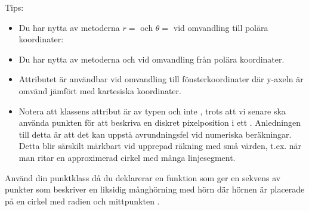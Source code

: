 \noindent Tips:
\begin{itemize}
\item Du har nytta av metoderna $r = $  och $\theta = $  vid omvandling till polära koordinater:


\item Du har nytta av metoderna  och  vid omvandling från polära koordinater.

\item Attributet  är användbar vid omvandling till fönsterkoordinater där y-axeln är omvänd jämfört med kartesiska koordinater.

\item Notera att klassens attribut är av typen  och inte , trots att vi senare ska använda punkten för att beskriva en diskret pixelposition i ett . Anledningen till detta är att det kan uppstå avrundningsfel vid numeriska beräkningar. Detta blir särskilt märkbart vid upprepad räkning med små värden, t.ex. när man ritar en approximerad cirkel med många linjesegment.
\end{itemize}

\Subtask Använd din punktklass då du deklarerar en funktion  som ger en sekvens av punkter som beskriver en liksidig månghörning med  hörn där hörnen är placerade på en cirkel med radien  och mittpunkten .

